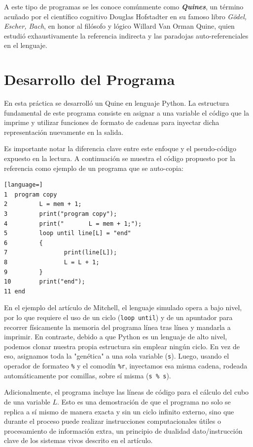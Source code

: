 \documentclass[a4paper,12pt]{article}
\begin{document}
A este tipo de programas se les conoce comúnmente como \textbf{\textit{Quines}}, un término acuñado por el científico cognitivo Douglas Hofstadter en su famoso libro \textit{Gödel, Escher, Bach}, en honor al filósofo y lógico Willard Van Orman Quine, quien estudió exhaustivamente la referencia indirecta y las paradojas auto-referenciales en el lenguaje.

\section{Desarrollo del Programa}
En esta práctica se desarrolló un Quine en lenguaje Python. La estructura fundamental de este programa consiste en asignar a una variable el código que la imprime y utilizar funciones de formato de cadenas para inyectar dicha representación nuevamente en la salida.

Es importante notar la diferencia clave entre este enfoque y el pseudo-código expuesto en la lectura. A continuación se muestra el código propuesto por la referencia como ejemplo de un programa que se auto-copia:

\begin{lstlisting}[language=]
1  program copy
2         L = mem + 1;
3         print("program copy");
4         print("       L = mem + 1;");
5         loop until line[L] = "end"
6         {
7                print(line[L]);
8                L = L + 1;
9         }
10        print("end");
11 end
\end{lstlisting}

En el ejemplo del artículo de Mitchell, el lenguaje simulado opera a bajo nivel, por lo que requiere el uso de un ciclo (\texttt{loop until}) y de un apuntador para recorrer físicamente la memoria del programa línea tras línea y mandarla a imprimir. En contraste, debido a que Python es un lenguaje de alto nivel, podemos clonar nuestra propia estructura sin emplear ningún ciclo. En vez de eso, asignamos toda la "genética" a una sola variable (\texttt{s}). Luego, usando el operador de formateo \texttt{\%} y el comodín \texttt{\%r}, inyectamos esa misma cadena, rodeada automáticamente por comillas, sobre sí misma (\texttt{s \% s}).

Adicionalmente, el programa incluye las líneas de código para el cálculo del cubo de una variable $L$. Esto es una demostración de que el programa no solo se replica a sí mismo de manera exacta y sin un ciclo infinito externo, sino que durante el proceso puede realizar instrucciones computacionales útiles o procesamiento de información extra, un principio de dualidad dato/instrucción clave de los sistemas vivos descrito en el artículo.
\end{document}
